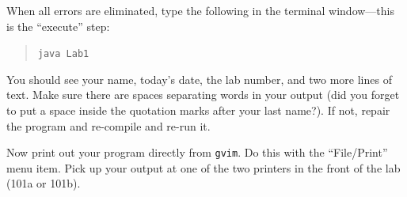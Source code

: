        When all errors are eliminated, type the following in the terminal
       window---this is the ``execute'' step:
       \begin{quote}
         \verb$java Lab1$
       \end{quote}
       You should see your name, today's date, the lab number, and two more
       lines of text. Make sure there are spaces separating words in your output
       (did you forget to put a space inside the quotation marks after your
         last name?). If not, repair the program and re-compile and re-run it.

       Now print out your program
       directly from {\tt gvim}. Do this with the ``File/Print'' menu item. Pick up
       your output at one of the two printers in the front of the lab (101a or 101b).


